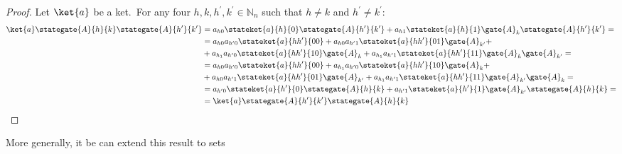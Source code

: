 \documentclass[sigconf,natbib=false]{acmart}
\begin{document}
\begin{proof}
	Let $\ket{a}$ be a ket.\ For any four $h,k,h^\prime, k^\prime \in \mathbb{N}_n$ such that $h\neq k$ and $h^\prime\neq k^\prime$:
\begin{align*}
		\ket{a}\stategate{A}{h}{k}\stategate{A}{h^\prime}{k^\prime}
		&=a_{h0}\stateket{a}{h}{0}\stategate{A}{h^\prime}{k^\prime}+a_{h1}\stateket{a}{h}{1}\gate{A}_{k}\stategate{A}{h^\prime}{k^\prime}=\\
		&=a_{h0}a_{h^\prime 0}\stateket{a}{hh^\prime}{00}+a_{h0}a_{h^\prime 1}\stateket{a}{hh^\prime}{01}\gate{A}_{k^\prime}+\\
		&+a_{h_1}a_{h^\prime 0}\stateket{a}{hh^\prime}{10}\gate{A}_{k}+a_{h_1}a_{h^\prime 1}\stateket{a}{hh^\prime}{11}\gate{A}_{k}\gate{A}_{k^\prime}=\\
		&=a_{h0}a_{h^\prime 0}\stateket{a}{hh^\prime}{00}+a_{h_1}a_{h^\prime 0}\stateket{a}{hh^\prime}{10}\gate{A}_{k}+\\
		&+a_{h0}a_{h^\prime 1}\stateket{a}{hh^\prime}{01}\gate{A}_{k^\prime}+a_{h_1}a_{h^\prime 1}\stateket{a}{hh^\prime}{11}\gate{A}_{k^\prime}\gate{A}_{k}=\\
		&=a_{h^\prime 0}\stateket{a}{h^\prime}{0}\stategate{A}{h}{k}+a_{h^\prime 1}\stateket{a}{h^\prime}{1}\gate{A}_{k^\prime}\stategate{A}{h}{k}=\\
		&=\ket{a}\stategate{A}{h^\prime}{k^\prime}\stategate{A}{h}{k}
\end{align*}
\end{proof}


More generally, it be can extend this result to sets
\end{document}

